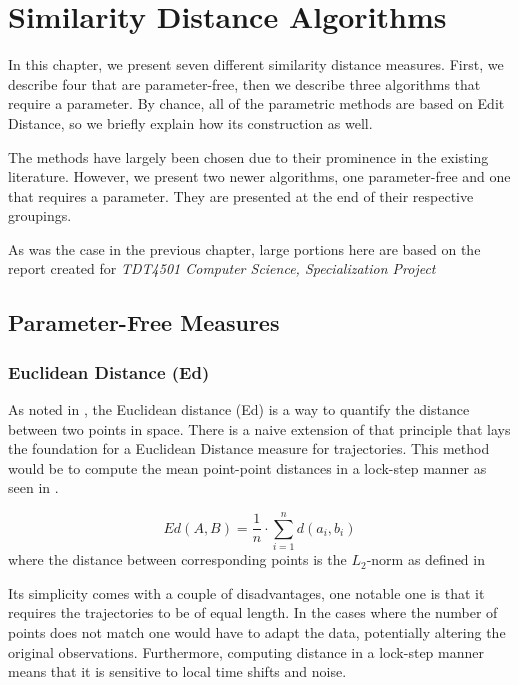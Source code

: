 \chapter{Similarity Distance Algorithms}
\label{ch:3}

In this chapter, we present seven different similarity distance measures. 
First, we describe four that are parameter-free, then we describe three algorithms that require a parameter. 
By chance, all of the parametric methods are based on Edit Distance, so we briefly explain how its construction as well. 


The methods have largely been chosen due to their prominence in the existing literature\cite{58-UCRTime,70-SimilarityDistances,8-EffectivenessStudy,53-TimeSeries,52-OnlineEfficient}. 
However, we present two newer algorithms, one parameter-free and one that requires a parameter.
They are presented at the end of their respective groupings. 
 
As was the case in the previous chapter, large portions here are based on the report created for \textit{TDT4501 Computer Science, Specialization Project}


\section{Parameter-Free Measures}

\subsection{Euclidean Distance (Ed)}
As noted in , the Euclidean distance (Ed) is a way to quantify the distance between two points in space. 
There is a naive extension of that principle that lays the foundation for a Euclidean Distance measure for trajectories\cite{44-FastSubsequence, 8-EffectivenessStudy, 24-ReviewTrajectory,86-ComputingMinimum}. This method would be to compute the mean point-point distances in a lock-step manner as seen in .

\begin{equation}\label{eq:ed}
Ed(A, B) = \frac{1}{n}\cdot \sum_{i=1}^{n}d(a_i, b_i)
\end{equation}
where the distance between corresponding points is the $L_2$-norm as defined in 

Its simplicity comes with a couple of disadvantages, one notable one is that it requires the trajectories to be of equal length. 
In the cases where the number of points does not match one would have to adapt the data, potentially altering the original observations. 
Furthermore, computing distance in a lock-step manner means that it is sensitive to local time shifts and noise\cite{12-RobustFast}. 

